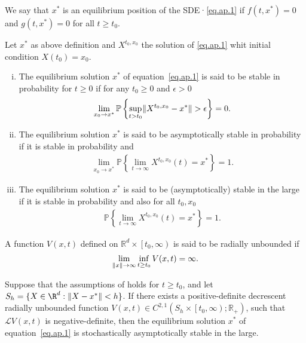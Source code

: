 \begin{definition}
		We say that $x^{*}$ is an equilibrium position of the SDE·\eqref{eq.ap.1} 
		if $f(t,x^{*})=0$ and $g(t,x^{*})=0$ for all
	$t\geq t_{0}$.
\end{definition}
%
\begin{definition}\label{dfn:app3}
	Let $x^{*}$ as above definition and
	$
		X^{t_{0},x_{0}}
	$
	the solution of \eqref{eq.ap.1} whit initial condition $X(t_0)=x_0$.
	\begin{enumerate}[(i)]
		\item The equilibrium solution $x^{*}$ of equation~\eqref{eq.ap.1} is said 
		to be stable in probability for $t\geq 0$ if for any $t_{0}\geq 0$ and 
		$\epsilon >0$
		\begin{align*}
			\lim\limits_{x_{0}\rightarrow x^{*}}\mathbb{P}
			\left\lbrace 
				\sup\limits_{t>t_{0}} 
				\lVert X^{t_{0},x_{0}}-x^{*}\rVert> \epsilon 
			\right\rbrace = 0.
		\end{align*}
		\item 
			The equilibrium solution $x^{*}$ is said to be asymptotically 
			stable in probability if it is stable in probability and 
			\begin{align*}
			\lim\limits_{x_{0}
				\rightarrow x^{*}}\mathbb{P}
				\left\lbrace 
					\lim\limits_{t\rightarrow \infty}X^{t_{0},x_{0}}(t)=x^{*}
				\right\rbrace = 1.
			\end{align*}
		\item
			The equilibrium solution $x^{*}$ is said to be (asymptotically) 
			stable in the large if it is stable in probability and also for all 
			$t_{0},x_{0}$
			\begin{align*}
				\mathbb{P}
					\left\lbrace 
						\lim
						\limits_{t\rightarrow \infty}X^{t_{0},x_{0}}(t)=x^{*}
					\right\rbrace =1.
			\end{align*}
	\end{enumerate}
\end{definition}
%
\begin{definition}\label{dfn:radial_unbonded}
	A function $V(x,t)$ defined on 
	$\mathbb{R}^{d}\times\left[t_{0},\infty\right)$ is said to be radially 
	unbounded if
	\begin{align*}\label{def.radi}
		\lim
		\limits_{\lVert x\rVert\rightarrow\infty}
		\inf\limits_{t\geq t_{0}}V(x,t)=\infty.
	\end{align*}
\end{definition}
%
\begin{theorem}\label{theo.ap.3}
	Suppose that the assumptions of  holds for
	$t\geq t_{0}$, and let 
	$S_{h} = 
		\{ 
			X\in \R^{d}:
			\norm{X-x^{*}}<h
		\}
	$. 
	If there exists a positive-definite decrescent radially unbounded 
	function 
	$
		V(x,t)\in C^{2,1}
		\left(
			S_{h}\times \left[t_{0},\infty 
		\right);
		\mathbb{R}_{+}\right)
	$, such that $\mathcal{L}V(x,t)$ is 
	negative-definite, 
	then the equilibrium solution $x^{*}$ of 
	equation~\eqref{eq.ap.1} is stochastically asymptotically stable in the large.
\end{theorem}
